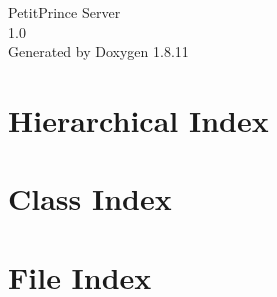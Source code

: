 \documentclass[twoside]{book}
\newcommand{\+}{\discretionary{\mbox{\scriptsize$\hookleftarrow$}}{}{}}
\newcommand{\clearemptydoublepage}{%
  \newpage{\pagestyle{empty}\cleardoublepage}%
}
\begin{document}
\hypersetup{pageanchor=false,
             bookmarksnumbered=true,
             pdfencoding=unicode
            }
\begin{titlepage}
\vspace*{7cm}
\begin{center}%
{\Large Petit\+Prince Server \\[1ex]\large 1.\+0 }\\
\vspace*{1cm}
{\large Generated by Doxygen 1.8.11}\\
\end{center}
\end{titlepage}
\clearemptydoublepage
\tableofcontents
\clearemptydoublepage
{}
\hypersetup{pageanchor=true}

\chapter{Hierarchical Index}

\chapter{Class Index}

\chapter{File Index}

\end{document}

